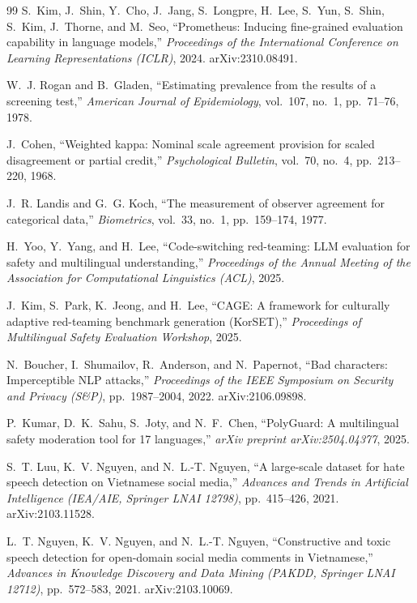 \documentclass[11pt]{article}
\begin{document}
\begin{thebibliography}{99}
S.~Kim, J.~Shin, Y.~Cho, J.~Jang, S.~Longpre, H.~Lee, S.~Yun, S.~Shin, S.~Kim, J.~Thorne, and M.~Seo,
``Prometheus: Inducing fine-grained evaluation capability in language models,''
\textit{Proceedings of the International Conference on Learning Representations (ICLR)}, 2024. arXiv:2310.08491.

W.~J. Rogan and B.~Gladen,
``Estimating prevalence from the results of a screening test,''
\textit{American Journal of Epidemiology}, vol.~107, no.~1, pp.~71--76, 1978.

J.~Cohen,
``Weighted kappa: Nominal scale agreement provision for scaled disagreement or partial credit,''
\textit{Psychological Bulletin}, vol.~70, no.~4, pp.~213--220, 1968.

J.~R. Landis and G.~G. Koch,
``The measurement of observer agreement for categorical data,''
\textit{Biometrics}, vol.~33, no.~1, pp.~159--174, 1977.

H.~Yoo, Y.~Yang, and H.~Lee,
``Code-switching red-teaming: {LLM} evaluation for safety and multilingual understanding,''
\textit{Proceedings of the Annual Meeting of the Association for Computational Linguistics (ACL)}, 2025.

J.~Kim, S.~Park, K.~Jeong, and H.~Lee,
``{CAGE}: A framework for culturally adaptive red-teaming benchmark generation ({KorSET}),''
\textit{Proceedings of Multilingual Safety Evaluation Workshop}, 2025.

N.~Boucher, I.~Shumailov, R.~Anderson, and N.~Papernot,
``Bad characters: Imperceptible {NLP} attacks,''
\textit{Proceedings of the IEEE Symposium on Security and Privacy (S\&P)}, pp.~1987--2004, 2022. arXiv:2106.09898.

P.~Kumar, D.~K.~Sahu, S.~Joty, and N.~F.~Chen,
``{PolyGuard}: A multilingual safety moderation tool for 17 languages,''
\textit{arXiv preprint arXiv:2504.04377}, 2025.

S.~T. Luu, K.~V. Nguyen, and N.~L.-T. Nguyen,
``A large-scale dataset for hate speech detection on {Vietnamese} social media,''
\textit{Advances and Trends in Artificial Intelligence (IEA/AIE, Springer LNAI 12798)}, pp.~415--426, 2021. arXiv:2103.11528.

L.~T. Nguyen, K.~V. Nguyen, and N.~L.-T. Nguyen,
``Constructive and toxic speech detection for open-domain social media comments in {Vietnamese},''
\textit{Advances in Knowledge Discovery and Data Mining (PAKDD, Springer LNAI 12712)}, pp.~572--583, 2021. arXiv:2103.10069.


\end{thebibliography}
\end{document}
